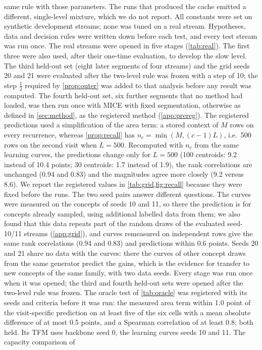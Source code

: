 \documentclass[11pt]{article}
\theoremstyle{plain}
\theoremstyle{definition}
\theoremstyle{remark}
\newcommand{\method}{\textsc{MICE}}   %
\begin{document}
same rule with those parameters. The runs that produced the cache emitted a different, single-level mixture, which we do not report. All constants were set on synthetic development streams; none was tuned on a real stream. Hypotheses, data and decision rules were written down before each test, and every test stream was run once. The real streams were opened in five stages (\cref{tab:real}). The first three were also used, after their one-time evaluation, to develop the slow level. The third held-out set (eight later segments of four streams) and the grid seeds 20 and 21 were evaluated after the two-level rule was frozen with a step of 10; the step $\tfrac12$ required by \cref{prop:outer} was added to that analysis before any result was computed. The fourth held-out set, six further segments that no method had loaded, was then run once with \method{} with fixed segmentation, otherwise as defined in \cref{sec:method}, as the registered method (\cref{app:prereg}). The registered predictions used a simplification of the area term: a stored context of $M$ rows on every recurrence, whereas \cref{prop:recall} has $n_c=\min(M,(c-1)L)$, i.e.\ 500 rows on the second visit when $L=500$. Recomputed with $n_c$ from the same learning curves, the predictions change only for $L=500$ (100 centroids: 9.2 instead of 10.4 points; 30 centroids: 1.7 instead of 1.9), the rank correlations are unchanged (0.94 and 0.83) and the magnitudes agree more closely (9.2 versus 8.6). We report the registered values in \cref{tab:grid,fig:recall} because they were fixed before the runs. The two seed pairs answer different questions. The curves were measured on the concepts of seeds 10 and 11, so there the prediction is for concepts already sampled, using additional labelled data from them; we also found that this data repeats part of the random draws of the evaluated seed-10/11 streams (\cref{app:grid}), and curves remeasured on independent rows give the same rank correlations (0.94 and 0.83) and predictions within 0.6 points. Seeds 20 and 21 share no data with the curves: there the curves of other concept draws from the same generator predict the gains, which is the evidence for transfer to new concepts of the same family, with two data seeds. Every stage was run once when it was opened; the third and fourth held-out sets were opened after the   two-level rule was frozen. The oracle test of \cref{tab:oracle} was registered with its seeds and criteria before it was run: the measured area term within 1.0 point of the visit-specific prediction on at least five of the six cells with a mean absolute difference of at most 0.5 points, and a Spearman correlation of at least 0.8; both held. Its TFM uses backbone seed 0, the learning curves seeds 10 and 11. The capacity comparison of
\end{document}
